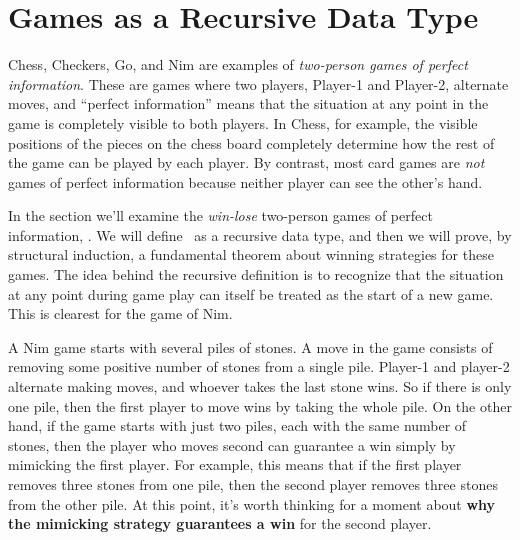 \begin{definition}
\begin{problems}
\homeworkproblems
{}

\end{problems}

\newcommand{\nimg}[1]{\text{Nim}_{\ang{#1}}}

\section{Games as a Recursive Data Type}\label{recursive_games}
Chess, Checkers, Go, and Nim are examples of \emph{two-person games of
  perfect information}.  These are games where two players, Player-1
and Player-2, alternate moves, and ``perfect information'' means that
the situation at any point in the game is completely visible to both
players.  In Chess, for example, the visible positions of the pieces
on the chess board completely determine how the rest of the game can
be played by each player.  By contrast, most card games are \emph{not}
games of perfect information because neither player can see the
other's hand.

In the section we'll examine the \emph{win-lose} two-person games of
perfect information, \wnls.  We will define \wnls\ as a recursive data
type, and then we will prove, by structural induction, a fundamental
theorem about winning strategies for these games.  The idea behind the
recursive definition is to recognize that the situation at any point
during game play can itself be treated as the start of a new game.
This is clearest for the game of Nim.

A Nim game starts with several piles of stones.  A move in the game
consists of removing some positive number of stones from a single
pile.  Player-1 and player-2 alternate making moves, and whoever takes
the last stone wins.  So if there is only one pile, then the first
player to move wins by taking the whole pile.  On the other hand, if
the game starts with just two piles, each with the same number of
stones, then the player who moves second can guarantee a win simply by
mimicking the first player.  For example, this means that if the first
player removes three stones from one pile, then the second player
removes three stones from the other pile.  At this point, it's worth
thinking for a moment about \textbf{why the mimicking strategy
  guarantees a win} for the second player.


\end{definition}
